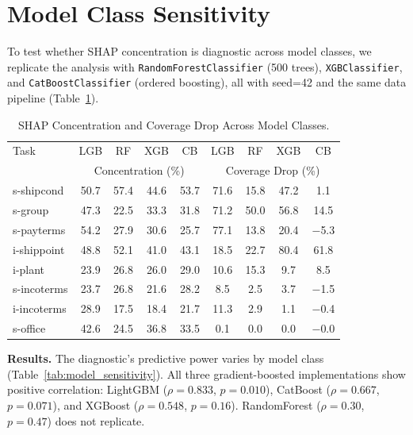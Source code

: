 \documentclass{uai2026} %
\begin{document}
\section{Model Class Sensitivity}\label{app:rf}

To test whether SHAP concentration is diagnostic across model classes, we replicate the analysis with \texttt{RandomForestClassifier} (500 trees), \texttt{XGBClassifier}, and \texttt{CatBoostClassifier} (ordered boosting), all with seed=42 and the same data pipeline (Table~\ref{tab:rf}).

\begin{table}[htbp]
\centering
\caption{SHAP Concentration and Coverage Drop Across Model Classes.}\label{tab:rf}
\small
\begin{tabular}{@{}lcccccccc@{}}
\toprule
Task & LGB & RF & XGB & CB & LGB & RF & XGB & CB \\
 & \multicolumn{4}{c}{Concentration (\%)} & \multicolumn{4}{c}{Coverage Drop (\%)} \\
\midrule
s-shipcond & 50.7 & 57.4 & 44.6 & 53.7 & 71.6 & 15.8 & 47.2 & 1.1 \\
s-group & 47.3 & 22.5 & 33.3 & 31.8 & 71.2 & 50.0 & 56.8 & 14.5 \\
s-payterms & 54.2 & 27.9 & 30.6 & 25.7 & 77.1 & 13.8 & 20.4 & $-$5.3 \\
i-shippoint & 48.8 & 52.1 & 41.0 & 43.1 & 18.5 & 22.7 & 80.4 & 61.8 \\
i-plant & 23.9 & 26.8 & 26.0 & 29.0 & 10.6 & 15.3 & 9.7 & 8.5 \\
s-incoterms & 23.7 & 26.8 & 21.6 & 28.2 & 8.5 & 2.5 & 3.7 & $-$1.5 \\
i-incoterms & 28.9 & 17.5 & 18.4 & 21.7 & 11.3 & 2.9 & 1.1 & $-$0.4 \\
s-office & 42.6 & 24.5 & 36.8 & 33.5 & 0.1 & 0.0 & 0.0 & $-$0.0 \\
\bottomrule
\end{tabular}
\end{table}

\textbf{Results.} The diagnostic's predictive power varies by model class (Table~\ref{tab:model_sensitivity}). All three gradient-boosted implementations show positive correlation: LightGBM ($\rho = 0.833$, $p = 0.010$), CatBoost ($\rho = 0.667$, $p = 0.071$), and XGBoost ($\rho = 0.548$, $p = 0.16$). RandomForest ($\rho = 0.30$, $p = 0.47$) does not replicate.
\end{document}
